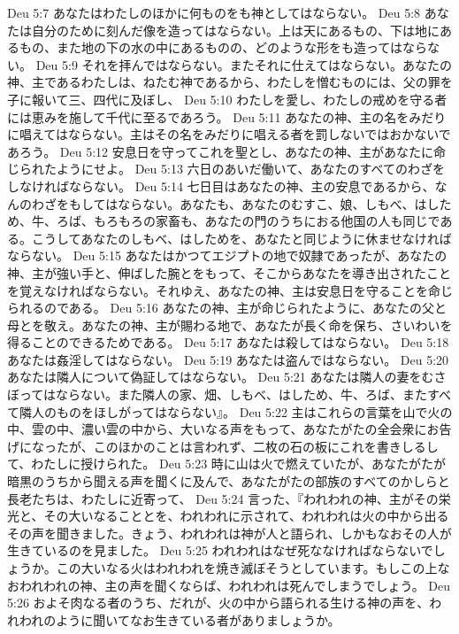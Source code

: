 Deu 5:7  あなたはわたしのほかに何ものをも神としてはならない。
Deu 5:8  あなたは自分のために刻んだ像を造ってはならない。上は天にあるもの、下は地にあるもの、また地の下の水の中にあるものの、どのような形をも造ってはならない。
Deu 5:9  それを拝んではならない。またそれに仕えてはならない。あなたの神、主であるわたしは、ねたむ神であるから、わたしを憎むものには、父の罪を子に報いて三、四代に及ぼし、
Deu 5:10  わたしを愛し、わたしの戒めを守る者には恵みを施して千代に至るであろう。
Deu 5:11  あなたの神、主の名をみだりに唱えてはならない。主はその名をみだりに唱える者を罰しないではおかないであろう。
Deu 5:12  安息日を守ってこれを聖とし、あなたの神、主があなたに命じられたようにせよ。
Deu 5:13  六日のあいだ働いて、あなたのすべてのわざをしなければならない。
Deu 5:14  七日目はあなたの神、主の安息であるから、なんのわざをもしてはならない。あなたも、あなたのむすこ、娘、しもべ、はしため、牛、ろば、もろもろの家畜も、あなたの門のうちにおる他国の人も同じである。こうしてあなたのしもべ、はしためを、あなたと同じように休ませなければならない。
Deu 5:15  あなたはかつてエジプトの地で奴隷であったが、あなたの神、主が強い手と、伸ばした腕とをもって、そこからあなたを導き出されたことを覚えなければならない。それゆえ、あなたの神、主は安息日を守ることを命じられるのである。
Deu 5:16  あなたの神、主が命じられたように、あなたの父と母とを敬え。あなたの神、主が賜わる地で、あなたが長く命を保ち、さいわいを得ることのできるためである。
Deu 5:17  あなたは殺してはならない。
Deu 5:18  あなたは姦淫してはならない。
Deu 5:19  あなたは盗んではならない。
Deu 5:20  あなたは隣人について偽証してはならない。
Deu 5:21  あなたは隣人の妻をむさぼってはならない。また隣人の家、畑、しもべ、はしため、牛、ろば、またすべて隣人のものをほしがってはならない』。
Deu 5:22  主はこれらの言葉を山で火の中、雲の中、濃い雲の中から、大いなる声をもって、あなたがたの全会衆にお告げになったが、このほかのことは言われず、二枚の石の板にこれを書きしるして、わたしに授けられた。
Deu 5:23  時に山は火で燃えていたが、あなたがたが暗黒のうちから聞える声を聞くに及んで、あなたがたの部族のすべてのかしらと長老たちは、わたしに近寄って、
Deu 5:24  言った、『われわれの神、主がその栄光と、その大いなることとを、われわれに示されて、われわれは火の中から出るその声を聞きました。きょう、われわれは神が人と語られ、しかもなおその人が生きているのを見ました。
Deu 5:25  われわれはなぜ死ななければならないでしょうか。この大いなる火はわれわれを焼き滅ぼそうとしています。もしこの上なおわれわれの神、主の声を聞くならば、われわれは死んでしまうでしょう。
Deu 5:26  およそ肉なる者のうち、だれが、火の中から語られる生ける神の声を、われわれのように聞いてなお生きている者がありましょうか。
